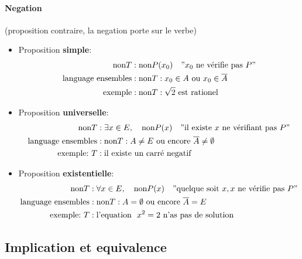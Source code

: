 \documentclass[
    11pt,
    a4paper,
    oneside,
    headinlcude, footinclude,
    twoside,
]{report}
\renewcommand{\bar}[1]{\overline{#1}}
\begin{document}
\paragraph{Negation}
\label{par:negation}
(proposition contraire, la negation porte sur le verbe)

\begin{itemize}
    \item Proposition \textbf{simple}:
        \[
        \begin{split}
            \textrm{non} T &: \textrm{non} P(x_{0}) \quad "x_{0} \ \textrm{ne vérifie pas}\ P"\\
            \textrm{language ensembles}  &: \textrm{non} T: x_{0} \in A \ \textrm{ou} \
            x_{0} \in \bar A\\
            \textrm{exemple}&: \textrm{non} T : \sqrt{2} \ \textrm{est rationel} 
        \end{split}
        \]

    \item Proposition \textbf{universelle}: 
        \[
        \begin{split}
            \textrm{non} T &: \exists x \in E, \quad \textrm{non} P(x) \quad "\textrm{il
            existe}\  x\ \textrm{ne vérifiant pas}\ P"\\
            \textrm{language ensembles}  &: \textrm{non} T: A \neq E \ \textrm{ou
            encore}\ \bar A \neq \emptyset\\
            \textrm{exemple:}\ T &: \textrm{il existe un carré negatif} 
        \end{split}
        \]

    \item Proposition \textbf{existentielle}:
        \[
        \begin{split}
            \textrm{non} T &: \forall x \in E, \quad \textrm{non} P(x) \quad "\textrm{quelque
            soit}\  x, x \ \textrm{ne vérifie pas}\ P"\\
            \textrm{language ensembles}  &: \textrm{non} T: A = \emptyset \ \textrm{ou
            encore}\ \bar A = E\\
            \textrm{exemple:}\ T &: \textrm{l'equation }\ x^{2} = 2 \ \textrm{n'as
            pas de solution} 
        \end{split}
        \]
\end{itemize}

\subsection{Implication et equivalence}
\label{sub:implication_et_equivalence}
\end{document}
